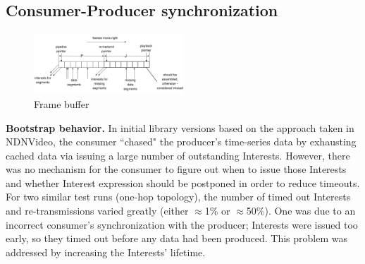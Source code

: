 \documentclass{icn/sig-alternate-2013} %
\begin{document}



\subsection{Consumer-Producer synchronization}

\begin{figure}[t!]
\centering
\includegraphics[width=0.5\textwidth]{buffer}
\caption{Frame buffer}
\label{fig:old-buf}
\end{figure}



%
%

\textbf{Bootstrap behavior.} In initial library versions based on the approach taken in NDNVideo, the consumer ``chased" the producer's time-series data by exhausting cached data via issuing a large number of outstanding Interests. However, there was no mechanism for the consumer to figure out when to issue those Interests and whether Interest expression should be postponed in order to reduce timeouts. For two similar test runs (one-hop topology), the number of timed out Interests and re-transmissions varied greatly (either $\approx$1\% or $\approx$50\%). One was due to an incorrect consumer's synchronization with the producer; Interests were issued too early, so they timed out before any data had been produced. This problem was addressed by increasing the Interests' lifetime. 
\end{document}
